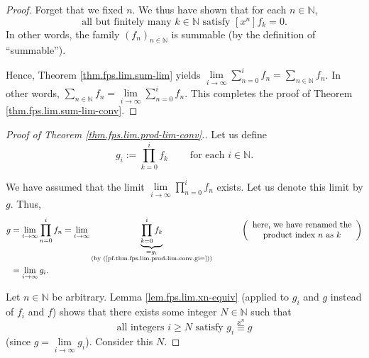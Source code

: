 \begin{fineprint}
\begin{proof}
Forget that we fixed $n$. We thus have shown that for each $n\in\mathbb{N}$,
\[
\text{all but finitely many }k\in\mathbb{N}\text{ satisfy }\left[
x^{n}\right]  f_{k}=0.
\]
In other words, the family $\left(  f_{n}\right)  _{n\in\mathbb{N}}$ is
summable (by the definition of \textquotedblleft summable\textquotedblright).

Hence, Theorem \ref{thm.fps.lim.sum-lim} yields $\lim\limits_{i\rightarrow
\infty}\sum_{n=0}^{i}f_{n}=\sum_{n\in\mathbb{N}}f_{n}$. In other words,
$\sum_{n\in\mathbb{N}}f_{n}=\lim\limits_{i\rightarrow\infty}\sum_{n=0}%
^{i}f_{n}$. This completes the proof of Theorem \ref{thm.fps.lim.sum-lim-conv}.
\end{proof}

\begin{proof}
[Proof of Theorem \ref{thm.fps.lim.prod-lim-conv}.]Let us define%
\begin{equation}
g_{i}:=\prod_{k=0}^{i}f_{k}\ \ \ \ \ \ \ \ \ \ \text{for each }i\in\mathbb{N}.
\label{pf.thm.fps.lim.prod-lim-conv.gi=}%
\end{equation}


We have assumed that the limit $\lim\limits_{i\rightarrow\infty}\prod
_{n=0}^{i}f_{n}$ exists. Let us denote this limit by $g$. Thus,%
\begin{align}
g  &  =\lim\limits_{i\rightarrow\infty}\prod_{n=0}^{i}f_{n}=\lim
\limits_{i\rightarrow\infty}\underbrace{\prod_{k=0}^{i}f_{k}}%
_{\substack{=g_{i}\\\text{(by (\ref{pf.thm.fps.lim.prod-lim-conv.gi=}))}%
}}\ \ \ \ \ \ \ \ \ \ \left(
\begin{array}
[c]{c}%
\text{here, we have renamed the}\\
\text{product index }n\text{ as }k
\end{array}
\right) \nonumber\\
&  =\lim\limits_{i\rightarrow\infty}g_{i}.
\label{pf.thm.fps.lim.prod-lim-conv.g=lim}%
\end{align}


Let $n\in\mathbb{N}$ be arbitrary. Lemma \ref{lem.fps.lim.xn-equiv} (applied
to $g_{i}$ and $g$ instead of $f_{i}$ and $f$) shows that there exists some
integer $N\in\mathbb{N}$ such that
\begin{equation}
\text{all integers }i\geq N\text{ satisfy }g_{i}\overset{x^{n}}{\equiv}g
\label{pf.thm.fps.lim.prod-lim-conv.gi-equiv-g}%
\end{equation}
(since $g=\lim\limits_{i\rightarrow\infty}g_{i}$). Consider this $N$.


\end{proof}
\end{fineprint}
